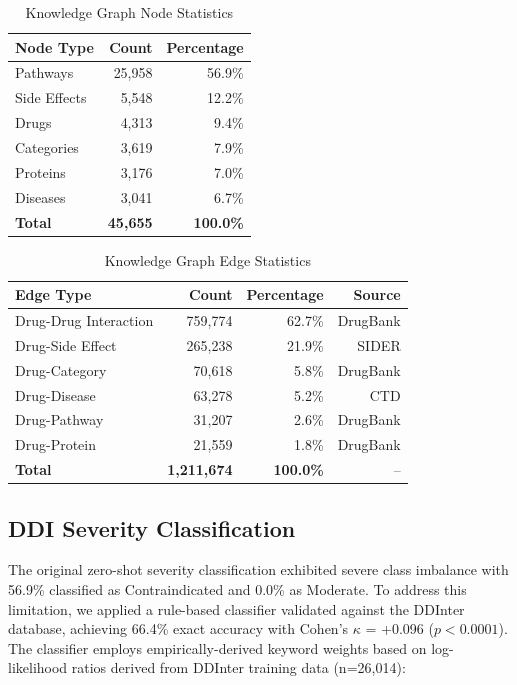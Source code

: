 \documentclass[11pt,a4paper]{article}
\begin{document}
\begin{table}[H]
\centering
\caption{Knowledge Graph Node Statistics}
\label{tab:kg_nodes}
\begin{tabular}{lrr}
\toprule
\textbf{Node Type} & \textbf{Count} & \textbf{Percentage} \\
\midrule
Pathways & 25,958 & 56.9\% \\
Side Effects & 5,548 & 12.2\% \\
Drugs & 4,313 & 9.4\% \\
Categories & 3,619 & 7.9\% \\
Proteins & 3,176 & 7.0\% \\
Diseases & 3,041 & 6.7\% \\
\midrule
\textbf{Total} & \textbf{45,655} & \textbf{100.0\%} \\
\bottomrule
\end{tabular}
\end{table}

\begin{table}[H]
\centering
\caption{Knowledge Graph Edge Statistics}
\label{tab:kg_edges}
\begin{tabular}{lrrr}
\toprule
\textbf{Edge Type} & \textbf{Count} & \textbf{Percentage} & \textbf{Source} \\
\midrule
Drug-Drug Interaction & 759,774 & 62.7\% & DrugBank \\
Drug-Side Effect & 265,238 & 21.9\% & SIDER \\
Drug-Category & 70,618 & 5.8\% & DrugBank \\
Drug-Disease & 63,278 & 5.2\% & CTD \\
Drug-Pathway & 31,207 & 2.6\% & DrugBank \\
Drug-Protein & 21,559 & 1.8\% & DrugBank \\
\midrule
\textbf{Total} & \textbf{1,211,674} & \textbf{100.0\%} & -- \\
\bottomrule
\end{tabular}
\end{table}

\subsection*{DDI Severity Classification}

The original zero-shot severity classification exhibited severe class imbalance with 56.9\% classified as Contraindicated and 0.0\% as Moderate. To address this limitation, we applied a rule-based classifier validated against the DDInter database, achieving 66.4\% exact accuracy with Cohen's $\kappa$ = +0.096 ($p < 0.0001$). The classifier employs empirically-derived keyword weights based on log-likelihood ratios derived from DDInter training data (n=26,014):
\end{document}
